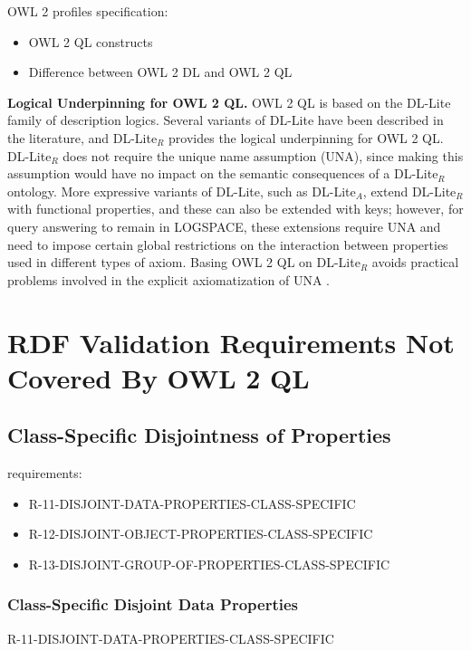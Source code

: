 \documentclass{llncs}
\begin{document}
OWL 2 profiles specification: \cite{owl2profiles2008}

\begin{itemize}
  \item OWL 2 QL constructs
	\item Difference between OWL 2 DL and OWL 2 QL
\end{itemize}

\textbf{Logical Underpinning for OWL 2 QL.}
OWL 2 QL is based on the DL-Lite family of description logics. Several variants of DL-Lite have been described in the literature, and DL-Lite$_R$ provides the logical underpinning for OWL 2 QL. DL-Lite$_R$ does not require the unique name assumption (UNA), since making this assumption would have no impact on the semantic consequences of a DL-Lite$_R$ ontology. More expressive variants of DL-Lite, such as DL-Lite$_A$, extend DL-Lite$_R$ with functional properties, and these can also be extended with keys; however, for query answering to remain in LOGSPACE, these extensions require UNA and need to impose certain global restrictions on the interaction between properties used in different types of axiom. Basing OWL 2 QL on DL-Lite$_R$ avoids practical problems involved in the explicit axiomatization of UNA \cite{owl2profiles2008}. 

\section{RDF Validation Requirements Not Covered By OWL 2 QL}

\subsection{Class-Specific Disjointness of Properties}

requirements:

\begin{itemize}
	\item R-11-DISJOINT-DATA-PROPERTIES-CLASS-SPECIFIC
  \item R-12-DISJOINT-OBJECT-PROPERTIES-CLASS-SPECIFIC
  \item R-13-DISJOINT-GROUP-OF-PROPERTIES-CLASS-SPECIFIC
\end{itemize}

\subsubsection{Class-Specific Disjoint Data Properties}

R-11-DISJOINT-DATA-PROPERTIES-CLASS-SPECIFIC
\end{document}
